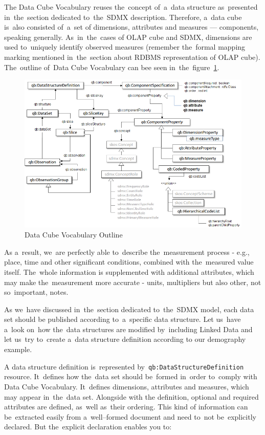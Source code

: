 The Data Cube Vocabulary reuses the~concept of~a~data structure as~presented in~the~section
dedicated to~the~SDMX description. Therefore, a~data cube is~also consisted of~a~set of
dimensions, attributes and measures --- components, speaking generally. As~in~the~cases of
OLAP cube and SDMX, dimensions are used to~uniquely identify observed measures
(remember the~formal mapping marking mentioned in~the~section about RDBMS representation
of OLAP cube). The~outline of~Data Cube Vocabulary can bee seen in~the~figure~\ref{fig:lod-cloud}.
 
\begin{figure}
	\centering
	\includegraphics[width=150mm]{img/dcv-schema.png}
	\caption{Data Cube Vocabulary Outline~\cite{dcv}}
	\label{fig:lod-cloud}
\end{figure}

As a~result, we~are perfectly able to~describe the~measurement process - e.g., place, time and
other significant conditions, combined with the~measured value itself. The~whole information
is supplemented with additional attributes, which may make the~measurement more accurate
- units, multipliers but also other, not so~important, notes.

As we~have discussed in~the~section dedicated to~the~SDMX model, each data set should be
published according to~a~specific data structure. Let us~have a~look on~how the~data structures are
modified by~including Linked Data and let us~try to~create a~data structure definition according
to our demography example.

A data structure definition is~represented by~\texttt{qb:DataStructureDefinition} resource. It~defines
how the~data set should be~formed in~order to~comply with Data Cube Vocabulary. It~defines
dimensions, attributes and measures, which may appear in~the~data set. Alongside with the
definition, optional and required attributes are defined, as~well as~their ordering. This kind
of information can be~extracted easily from a~well--formed document and need to~not be~explicitly
declared. But the~explicit declaration enables you to:

